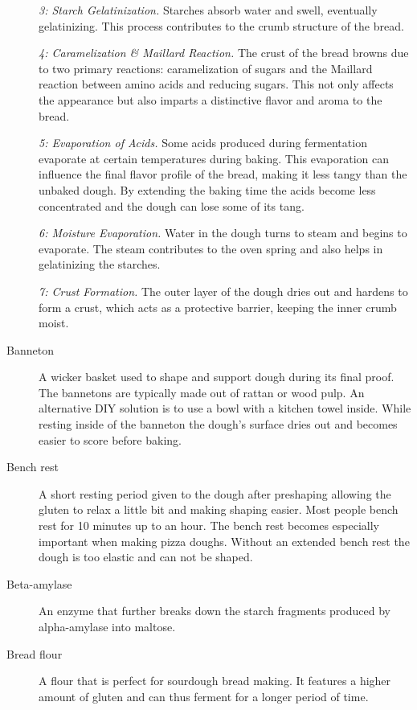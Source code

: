 \begin{description}
\emph{3: Starch Gelatinization.}  Starches absorb water and swell, eventually
gelatinizing. This process contributes to the crumb structure of the bread.

\emph{4: Caramelization \& Maillard Reaction.}  The crust of the bread browns due
to two primary reactions: caramelization of sugars and the Maillard reaction between
amino acids and reducing sugars. This not only affects the appearance but also imparts
a distinctive flavor and aroma to the bread.

\emph{5: Evaporation of Acids.} Some acids produced during fermentation evaporate at
certain temperatures during baking. This evaporation can influence the final flavor
profile of the bread, making it less tangy than the unbaked dough. By extending the
baking time the acids become less concentrated and the dough can lose some of its tang.

\emph{6: Moisture Evaporation.} Water in the dough turns to steam and begins to
evaporate. The steam contributes to the oven spring and also helps in gelatinizing
the starches.

\emph{7: Crust Formation.} The outer layer of the dough dries out and hardens to
form a crust, which acts as a protective barrier, keeping the inner crumb moist.

\item[Banneton] A wicker basket used to shape and support dough during its final
proof. The bannetons are typically made out of rattan or wood pulp. An alternative
DIY solution is to use a bowl with a kitchen towel inside. While resting inside of
the banneton the dough’s surface dries out and becomes easier to score before baking.

\item[Bench rest] A short resting period given to the dough after preshaping
allowing the gluten to relax a little bit and making shaping easier. Most people
bench rest for 10 minutes up to an hour. The bench rest becomes especially important
when making pizza doughs. Without an extended bench rest the dough is too elastic and
can not be shaped.

\item[Beta-amylase] An enzyme that further breaks down the starch fragments
produced by alpha-amylase into maltose.

\item[Bread flour] A flour that is perfect for sourdough bread making. It features
a higher amount of gluten and can thus ferment for a longer period of time.


\end{description}
